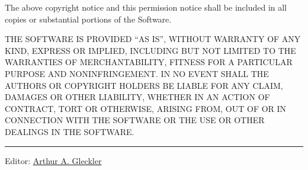 The above copyright notice and this permission notice shall be included
in all copies or substantial portions of the Software.

THE SOFTWARE IS PROVIDED ``AS IS'', WITHOUT WARRANTY OF ANY KIND,
EXPRESS OR IMPLIED, INCLUDING BUT NOT LIMITED TO THE WARRANTIES OF
MERCHANTABILITY, FITNESS FOR A PARTICULAR PURPOSE AND NONINFRINGEMENT.
IN NO EVENT SHALL THE AUTHORS OR COPYRIGHT HOLDERS BE LIABLE FOR ANY
CLAIM, DAMAGES OR OTHER LIABILITY, WHETHER IN AN ACTION OF CONTRACT,
TORT OR OTHERWISE, ARISING FROM, OUT OF OR IN CONNECTION WITH THE
SOFTWARE OR THE USE OR OTHER DEALINGS IN THE SOFTWARE.

\begin{center}\rule{0.5\linewidth}{\linethickness}\end{center}

Editor: \href{mailto:srfi-editors+at+srfi+dot+schemers+dot+org}{Arthur
A. Gleckler}
